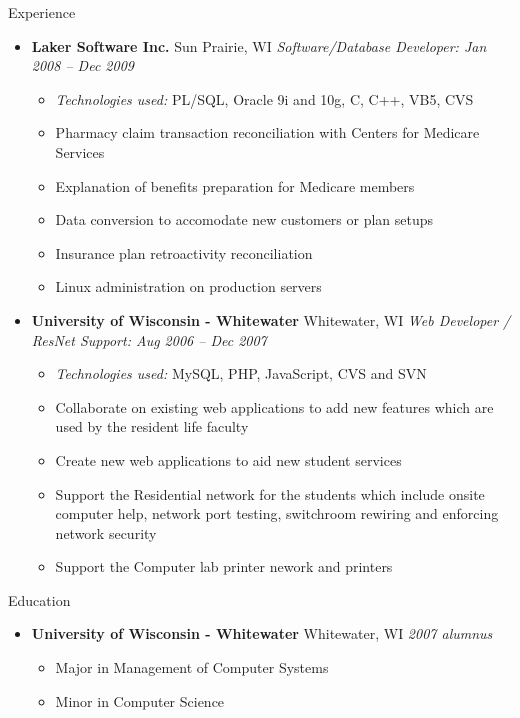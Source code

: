 \documentclass[11pt,oneside]{article}
\newenvironment{ressection}[1]{
    \vspace{4pt}
    {\fontfamily{phv}\selectfont\Large#1}
    \begin{itemize}
    \vspace{3pt}
}{
    \end{itemize}
}
\newcommand{\ressubitem}[1]{
    \vspace{-1pt}
    \item \begin{flushleft} #1 \end{flushleft}
}
\newcommand{\resbigitem}[3]{
    \vspace{-5pt}
    \item
    \textbf{#1} #2 \textit{#3}
}
\newenvironment{ressubsec}[3]{
    \resbigitem{#1}{#2}{#3}
    \vspace{-2pt}
    \begin{itemize}
}{
    \end{itemize}
}
\begin{document}
\begin{ressection}{Experience}
    \begin{ressubsec}{Laker Software Inc.}{Sun Prairie, WI}{Software/Database Developer: Jan 2008 -- Dec 2009}
        \ressubitem{\textit{Technologies used:} PL/SQL, Oracle 9i and 10g, C, C++, VB5, CVS}
        \ressubitem{Pharmacy claim transaction reconciliation with Centers for Medicare Services}
        \ressubitem{Explanation of benefits preparation for Medicare members}
        \ressubitem{Data conversion to accomodate new customers or plan setups}
        \ressubitem{Insurance plan retroactivity reconciliation}
        \ressubitem{Linux administration on production servers}
    \end{ressubsec}

    \begin{ressubsec}{University of Wisconsin - Whitewater}{Whitewater, WI}{Web Developer / ResNet Support: Aug 2006 -- Dec 2007}
        \ressubitem{\textit{Technologies used:} MySQL, PHP, JavaScript, CVS and SVN}
        \ressubitem{Collaborate on existing web applications to add new features which are used by the resident life faculty}
        \ressubitem{Create new web applications to aid new student services}
        \ressubitem{Support the Residential network for the students which include onsite computer help, network port testing, switchroom rewiring and enforcing network security}
        \ressubitem{Support the Computer lab printer nework and printers}
    \end{ressubsec}

\end{ressection}

\begin{ressection}{Education}

    \begin{ressubsec}{University of Wisconsin - Whitewater}{Whitewater, WI}{2007 alumnus}
        \ressubitem{Major in Management of Computer Systems}
        \ressubitem{Minor in Computer Science}
    \end{ressubsec}

\end{ressection}
\end{document}
